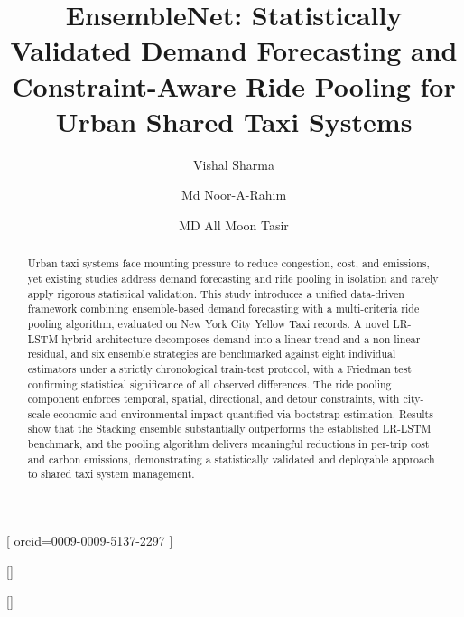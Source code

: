 \documentclass[a4paper,fleqn]{cas-dc}
\begin{document}
\let\WriteBookmarks\relax
\def\floatpagepagefraction{1}
\def\textpagefraction{.001}



\title[mode = title]{EnsembleNet: Statistically Validated Demand Forecasting and Constraint-Aware Ride Pooling for Urban Shared Taxi Systems}

\author[1]{Vishal Sharma}[
  orcid=0009-0009-5137-2297
]
\cormark[1]

\author[1]{Md Noor-A-Rahim}[]

\author[2]{MD All Moon Tasir}[]




\begin{abstract}
Urban taxi systems face mounting pressure to reduce congestion, cost, and emissions, yet existing studies address demand forecasting and ride pooling in isolation and rarely apply rigorous statistical validation.  This study introduces a unified data-driven framework combining ensemble-based demand forecasting with a multi-criteria ride pooling algorithm, evaluated on New York City Yellow Taxi records.  A novel LR-LSTM hybrid architecture decomposes demand into a linear trend and a non-linear residual, and six ensemble strategies are benchmarked against eight individual estimators under a strictly chronological train-test protocol, with a Friedman test confirming statistical significance of all observed differences.  The ride pooling component enforces temporal, spatial, directional, and detour constraints, with city-scale economic and environmental impact quantified via bootstrap estimation.  Results show that the Stacking ensemble substantially outperforms the established LR-LSTM benchmark, and the pooling algorithm delivers meaningful reductions in per-trip cost and carbon emissions, demonstrating a statistically validated and deployable approach to shared taxi system management.
\end{abstract}
\end{document}
